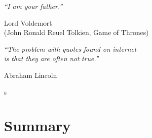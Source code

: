\documentclass[a4paper, 11pt, twoside]{Thesis}  %
\begin{document}

\cleardoublepage  %


\maketitleeng
\newpage{\pagestyle{empty}\cleardoublepage}

\pagestyle{empty}  %

\null\vfill
\begin{flushright}
\textit{``I am your father.''}\par
\smallskip
Lord Voldemort \\
(John Ronald Reuel Tolkien, Game of Thrones)
\end{flushright}
\bigskip
\begin{flushright}
\textit{``The problem with quotes found on internet \\
is that they are often not true.''}\par
\smallskip
Abraham Lincoln
\end{flushright}s

\vfill\vfill\vfill\vfill\vfill\vfill\null
\clearpage  %



\chapter*{Summary}

\clearpage  %
\end{document}
